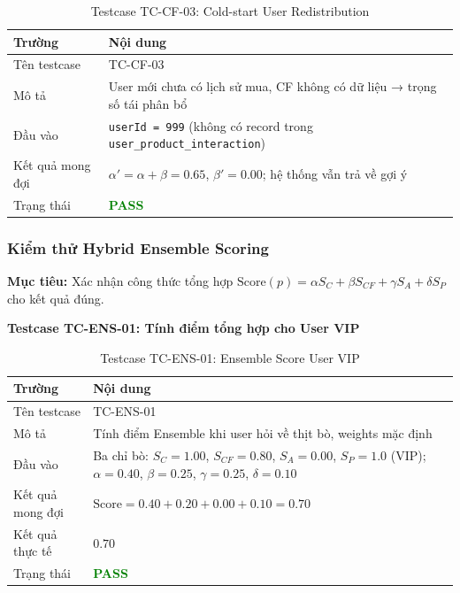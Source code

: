 \documentclass[12pt,a4paper]{report}
\begin{document}
\begin{table}[htbp]
\centering
\renewcommand{\arraystretch}{1.3}
\begin{tabular}{|l|p{8cm}|}
\hline
\rowcolor[HTML]{EFEFEF}
\textbf{Trường} & \textbf{Nội dung} \\ \hline
Tên testcase & TC-CF-03 \\ \hline
Mô tả & User mới chưa có lịch sử mua, CF không có dữ liệu → trọng số tái phân bổ \\ \hline
Đầu vào & \texttt{userId = 999} (không có record trong \texttt{user\_product\_interaction}) \\ \hline
Kết quả mong đợi & $\alpha' = \alpha + \beta = 0.65$, $\beta' = 0.00$; hệ thống vẫn trả về gợi ý \\ \hline
Trạng thái & \textcolor{green}{\textbf{PASS}} \\ \hline
\end{tabular}
\caption{Testcase TC-CF-03: Cold-start User Redistribution}
\end{table}

\subsubsection{Kiểm thử Hybrid Ensemble Scoring}

\textbf{Mục tiêu:} Xác nhận công thức tổng hợp $\text{Score}(p) = \alpha S_C + \beta S_{CF} + \gamma S_A + \delta S_P$ cho kết quả đúng.

\textbf{Testcase TC-ENS-01: Tính điểm tổng hợp cho User VIP}

\begin{table}[htbp]
\centering
\renewcommand{\arraystretch}{1.3}
\begin{tabular}{|l|p{8cm}|}
\hline
\rowcolor[HTML]{EFEFEF}
\textbf{Trường} & \textbf{Nội dung} \\ \hline
Tên testcase & TC-ENS-01 \\ \hline
Mô tả & Tính điểm Ensemble khi user hỏi về thịt bò, weights mặc định \\ \hline
Đầu vào & Ba chỉ bò: $S_C=1.00$, $S_{CF}=0.80$, $S_A=0.00$, $S_P=1.0$ (VIP); $\alpha=0.40$, $\beta=0.25$, $\gamma=0.25$, $\delta=0.10$ \\ \hline
Kết quả mong đợi & $\text{Score} = 0.40 + 0.20 + 0.00 + 0.10 = 0.70$ \\ \hline
Kết quả thực tế & $0.70$ \\ \hline
Trạng thái & \textcolor{green}{\textbf{PASS}} \\ \hline
\end{tabular}
\caption{Testcase TC-ENS-01: Ensemble Score User VIP}
\end{table}
\end{document}
